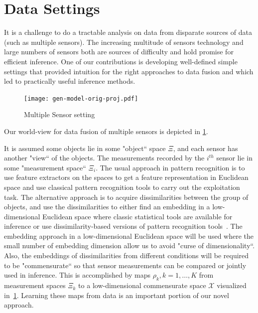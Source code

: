 \documentclass[12pt,oneside,final]{thesis}\usepackage[]{graphicx}\usepackage[]{color}
\begin{document}
\section{Data Settings}


 It is a challenge  to do a tractable analysis on data from disparate sources of data (such as multiple sensors). The increasing multitude  of sensors technology and large numbers of sensors both are  sources of difficulty and hold promise for efficient inference. One of our contributions is developing well-defined simple settings that provided intuition for the right approaches to data fusion and which led to practically useful inference methods.
 
 
\begin{figure}
\centering
\texttt{[image: gen-model-orig-proj.pdf]}
\caption{Multiple Sensor setting \label{fig:gen-model}}
\end{figure}

 Our world-view for data fusion of multiple sensors is depicted in \ref{fig:gen-model}.


It is assumed some objects lie in some "object`` space $\Xi$, and each sensor has another "view`` of the objects. The measurements recorded by the $i^{th}$ sensor lie in some "measurement space`` $\Xi_i$. The usual approach in pattern recognition is to use feature extractors on the spaces to get a feature representation in Euclidean space and use classical pattern recognition tools to carry out the exploitation task. The alternative approach is to acquire dissimilarities between the group of objects, and use the dissimilarities to either find an embedding in a low-dimensional Euclidean space where classic statistical tools are available for inference or use dissimilarity-based versions of pattern recognition tools~\cite{duin2005dissimilarity}. The embedding approach in a  low-dimensional Euclidean space will be used where the small number of embedding dimension allow us to avoid "curse of dimensionality``. Also, the embeddings of dissimilarities from  different conditions will be required to be "commensurate`` so that sensor measurements can be compared or jointly used in inference. This is accomplished by maps $\rho_k,k=1,\ldots,K$ from measurement spaces $\Xi_k$ to a low-dimensional commensurate space $\mathcal{X}$ visualized in~\ref{fig:gen-model}. Learning these maps from data is  an important portion of our novel  approach.
\label{sec:data}
\end{document}
